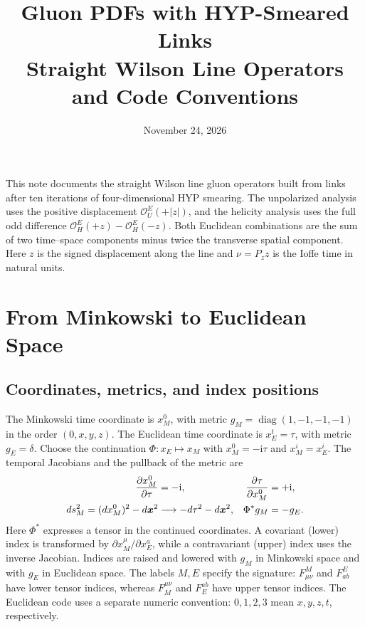\documentclass[11pt,a4paper]{article}
\title{Gluon PDFs with HYP-Smeared Links\\[0.2em]
  \large Straight Wilson Line Operators and Code Conventions}
\author{}
\date{November 24, 2026}
\newcommand{\ii}{\mathrm{i}}
\newcommand{\OPE}{\mathcal O}
\begin{document}
\maketitle

This note documents the straight Wilson line gluon operators built from
links after ten iterations of four-dimensional HYP smearing. The
unpolarized analysis uses the positive displacement \(\OPE_U^E(+|z|)\),
and the helicity analysis uses the full odd difference
\(\OPE_H^E(+z)-\OPE_H^E(-z)\). Both Euclidean combinations are the sum of
two time--space components minus twice the transverse spatial component.
Here \(z\) is the signed displacement along the line and \(\nu=P_z z\) is the
Ioffe time in natural units.

\section{From Minkowski to Euclidean Space}
\label{sec:wick-dictionary}

\subsection{Coordinates, metrics, and index positions}
The Minkowski time coordinate is \(x_M^0\), with metric
\(g_M=\operatorname{diag}(1,-1,-1,-1)\) in the order \((0,x,y,z)\).
The Euclidean time coordinate is \(x_E^t=\tau\), with metric \(g_E=\delta\).
Choose the continuation \(\Phi:x_E\mapsto x_M\) with
\(x_M^0=-\ii\tau\) and \(x_M^i=x_E^i\). The temporal Jacobians and the
pullback of the metric are
\begin{align}
 \frac{\partial x_M^0}{\partial\tau}&=-\ii,&
 \frac{\partial\tau}{\partial x_M^0}&=+\ii,\notag\\
 ds_M^2=(dx_M^0)^2-d\bm x^2&\longrightarrow-d\tau^2-d\bm x^2,&
 \Phi^*g_M&=-g_E.
 \label{eq:wick-metric}
\end{align}
Here \(\Phi^*\) expresses a tensor in the continued coordinates. A covariant
(lower) index is transformed by \(\partial x_M^\mu/\partial x_E^a\), while a
contravariant (upper) index uses the inverse Jacobian. Indices are raised
and lowered with \(g_M\) in Minkowski space and with \(g_E\) in Euclidean
space. The labels \(M,E\) specify the signature: \(F^M_{\mu\nu}\) and
\(F^E_{ab}\) have lower tensor indices, whereas \(F_M^{\mu\nu}\) and
\(F_E^{ab}\) have upper tensor indices. The Euclidean code uses a separate
numeric convention: \(0,1,2,3\) mean \(x,y,z,t\), respectively.
\end{document}
